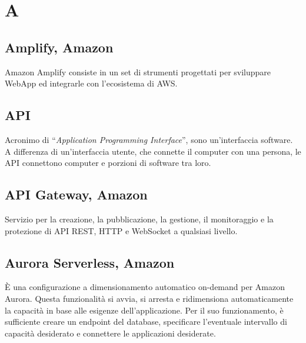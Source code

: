 \section{A}

\subsection{Amplify, Amazon}
Amazon Amplify consiste in un set di strumenti progettati per sviluppare WebApp ed integrarle con l'ecosistema di AWS. 

\subsection{API}
Acronimo di “\textit{Application Programming Interface}”, sono un’interfaccia software. A differenza di un’interfaccia utente, che connette il computer con una persona, le API connettono computer e porzioni di software tra loro.

\subsection{API Gateway, Amazon}
Servizio per la creazione, la pubblicazione, la gestione, il monitoraggio e la protezione di API REST, HTTP e WebSocket a qualsiasi livello.

\subsection{Aurora Serverless, Amazon}
È una configurazione a dimensionamento automatico on-demand per Amazon Aurora. Questa funzionalità si avvia, si arresta e ridimensiona automaticamente la capacità in base alle esigenze dell'applicazione. Per il suo funzionamento, è sufficiente creare un endpoint del database, specificare l'eventuale intervallo di capacità desiderato e connettere le applicazioni desiderate.  



